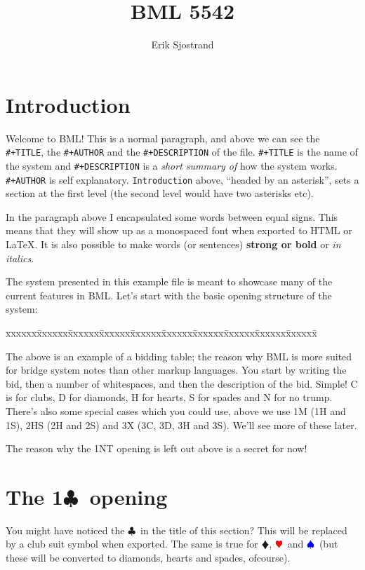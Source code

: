 \documentclass[a4paper]{article}
\title{BML 5542}
\author{Erik Sjostrand}
\newcommand{\BC}{\textcolor{OliveGreen}{$\clubsuit$}}
\newcommand{\BD}{\textcolor{RedOrange}{$\vardiamondsuit$}}
\newcommand{\BH}{\textcolor{Red}{$\varheartsuit${}}}
\newcommand{\BS}{\textcolor{Blue}{$\spadesuit${}}}
\newcommand{\pdfc}{\texorpdfstring{\BC{}}{C}}
\newenvironment{bidtable}
{\begin{tabbing}

xxxxxx\=xxxxxx\=xxxxxx\=xxxxxx\=xxxxxx\=xxxxxx\=xxxxxx\=xxxxxx\=xxxxxx\=xxxxxx\=\kill}
{\end{tabbing} }%
\begin{document}
\maketitle
\tableofcontents

\section{Introduction}

Welcome to BML! This is a normal paragraph, and above we can see
the \texttt{\#+TITLE}, the \texttt{\#+AUTHOR} and the \texttt{\#+DESCRIPTION} of the file. \texttt{\#+TITLE} is
the name of the system and \texttt{\#+DESCRIPTION} is a \emph{short summary of} how
the system works. \texttt{\#+AUTHOR} is self explanatory. \texttt{Introduction} above,
``headed by an asterisk'', sets a section at the first level (the second
level would have two asterisks etc).

In the paragraph above I encapsulated some words between equal
signs. This means that they will show up as a monospaced font when
exported to HTML or LaTeX. It is also possible to make words (or
sentences) \textbf{strong or bold} or \emph{in italics}.

The system presented in this example file is meant to showcase many
of the current features in BML. Let's start with the basic opening
structure of the system:

\begin{bidtable}

\end{bidtable}

The above is an example of a bidding table; the reason why BML is
more suited for bridge system notes than other markup languages. You
start by writing the bid, then a number of whitespaces, and then the
description of the bid. Simple! C is for clubs, D for diamonds, H
for hearts, S for spades and N for no trump. There's also some
special cases which you could use, above we use 1M (1H and 1S), 2HS
(2H and 2S) and 3X (3C, 3D, 3H and 3S). We'll see more of these
later.

The reason why the 1NT opening is left out above is a secret for
now!

\section{The 1\pdfc\ opening}

You might have noticed the \BC\ in the title of this section? This
will be replaced by a club suit symbol when exported. The same is
true for \BD , \BH\ and \BS\ (but these will be converted to diamonds,
hearts and spades, ofcourse).
\end{document}
